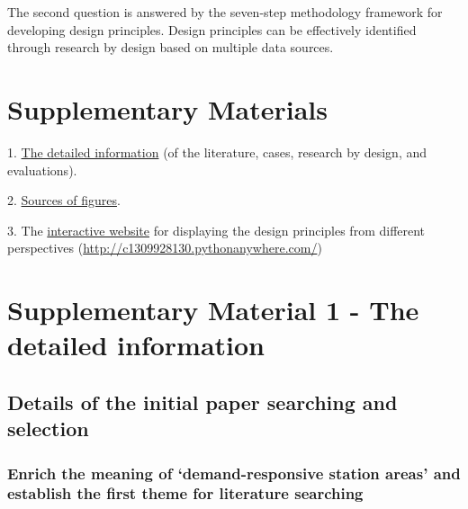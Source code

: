 \documentclass[]{article}
\begin{document}
The second question is answered by the seven-step methodology framework for developing design principles. Design principles can be effectively identified through research by design based on multiple data sources. 




\section*{Supplementary Materials}
\label{Supplementary materials}
1. \href{https://github.com/1309928130/Paper3_SupplementaryMaterials/blob/main/SupplementaryMaterials.pdf}{The detailed information} (of the literature, cases, research by design, and evaluations).

2. \href{https://github.com/1309928130/Paper3_SupplementaryMaterials/blob/main/Supplementary%20Material%202%20-%20Sources%20of%20Figures.md}{Sources of figures}.

3. The \href{http://c1309928130.pythonanywhere.com/}{interactive website} for displaying the design principles from different perspectives (\url{http://c1309928130.pythonanywhere.com/})




\setlength{\bibsep}{3pt} %

















\setcounter{section}{1}
\newpage
\section*{Supplementary Material 1 - The detailed information}





\subsection{Details of the initial paper searching and selection}

\subsubsection{Enrich the meaning of ‘demand-responsive station areas’ and establish the first theme for literature searching}
\end{document}
